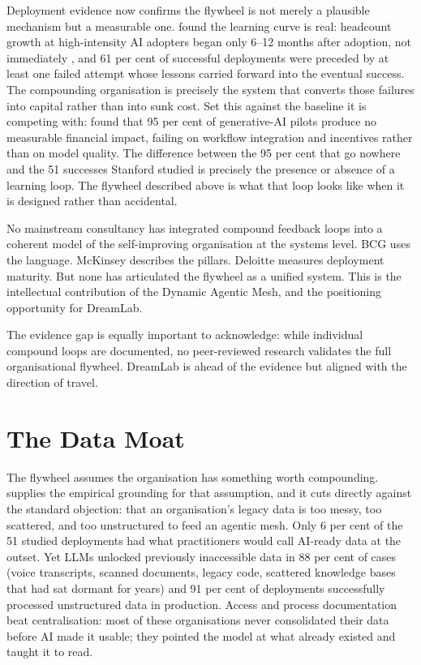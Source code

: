 Deployment evidence now confirms the flywheel is not merely a plausible mechanism but a measurable one. \textcite{Pereira2026Playbook} found the learning curve is real: headcount growth at high-intensity AI adopters began only 6--12 months after adoption, not immediately \parencite{RampRevelio2026}, and 61 per cent of successful deployments were preceded by at least one failed attempt whose lessons carried forward into the eventual success. The compounding organisation is precisely the system that converts those failures into capital rather than into sunk cost. Set this against the baseline it is competing with: \parencite{MITNANDA2025} found that 95 per cent of generative-AI pilots produce no measurable financial impact, failing on workflow integration and incentives rather than on model quality. The difference between the 95 per cent that go nowhere and the 51 successes Stanford studied is precisely the presence or absence of a learning loop. The flywheel described above is what that loop looks like when it is designed rather than accidental.

\begin{keyinsight}[title={The Gap This Fills}]
No mainstream consultancy has integrated compound feedback loops into a coherent model of the self-improving organisation at the systems level. BCG uses the language. McKinsey describes the pillars. Deloitte measures deployment maturity. But none has articulated the flywheel as a unified system. This is the intellectual contribution of the Dynamic Agentic Mesh, and the positioning opportunity for DreamLab.

The evidence gap is equally important to acknowledge: while individual compound loops are documented, no peer-reviewed research validates the full organisational flywheel. DreamLab is ahead of the evidence but aligned with the direction of travel.
\end{keyinsight}

\section{The Data Moat}

The flywheel assumes the organisation has something worth compounding. \textcite{Pereira2026Playbook} supplies the empirical grounding for that assumption, and it cuts directly against the standard objection: that an organisation's legacy data is too messy, too scattered, and too unstructured to feed an agentic mesh. Only 6 per cent of the 51 studied deployments had what practitioners would call AI-ready data at the outset. Yet LLMs unlocked previously inaccessible data in 88 per cent of cases (voice transcripts, scanned documents, legacy code, scattered knowledge bases that had sat dormant for years) and 91 per cent of deployments successfully processed unstructured data in production. Access and process documentation beat centralisation: most of these organisations never consolidated their data before AI made it usable; they pointed the model at what already existed and taught it to read.

